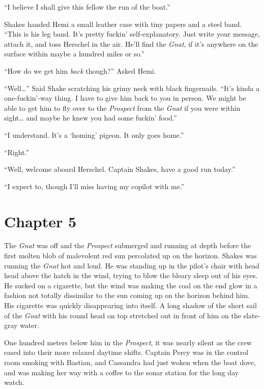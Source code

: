 \documentclass[
]{scrbook}
\begin{document}
``I believe I shall give this fellow the run of the boat.''

Shakes handed Hemi a small leather case with tiny papers and a steel
band. ``This is his leg band. It's pretty fuckin' self-explanatory. Just
write your message, attach it, and toss Herschel in the air. He'll find
the \emph{Gnat}, if it's anywhere on the surface within maybe a hundred
miles or so.''

``How do we get him \emph{back} though?'' Asked Hemi.

``Well\ldots{}'' Said Shake scratching his grimy neck with black
fingernails. ``It's kinda a one-fuckin'-way thing. I have to give him
back to you in person. We might be able to get him to fly over to the
\emph{Prospect} from the \emph{Gnat} if you were within sight\ldots{}
and maybe he knew you had some fuckin' food.''

``I understand. It's a `homing' pigeon. It only goes home.''

``Right.''

``Well, welcome aboard Herschel. Captain Shakes, have a good run
today.''

``I expect to, though I'll miss having my copilot with me.''

\hypertarget{chapter-5}{%
\chapter*{Chapter 5}\label{chapter-5}}

The \emph{Gnat} was off and the \emph{Prospect} submerged and running at
depth before the first molten blob of malevolent red sun percolated up
on the horizon. Shakes was running the \emph{Gnat} hot and loud. He was
standing up in the pilot's chair with head head above the hatch in the
wind, trying to blow the bleary sleep out of his eyes. He sucked on a
cigarette, but the wind was making the coal on the end glow in a fashion
not totally dissimilar to the sun coming up on the horizon behind him.
His cigarette was quickly disappearing into itself. A long shadow of the
short sail of the \emph{Gnat} with his round head on top stretched out
in front of him on the slate-gray water.

One hundred meters below him in the \emph{Prospect}, it was nearly
silent as the crew eased into their more relaxed daytime shifts. Captain
Percy was in the control room smoking with Bastian, and Cassandra had
just woken when the boat dove, and was making her way with a coffee to
the sonar station for the long day watch.
\end{document}
